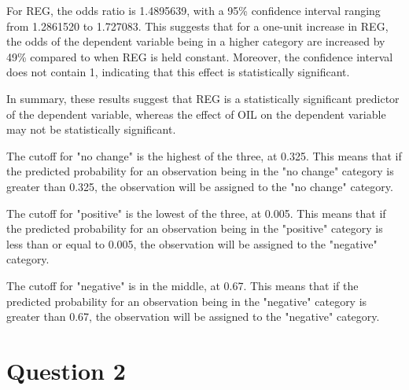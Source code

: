 \documentclass[12pt,letterpaper]{article}
\begin{document}
\begin{enumerate}
For REG, the odds ratio is 1.4895639, with a 95\% confidence interval ranging from 1.2861520 to 1.727083. This suggests that for a one-unit increase in REG, the odds of the dependent variable being in a higher category are increased by 49\% compared to when REG is held constant. Moreover, the confidence interval does not contain 1, indicating that this effect is statistically significant.

In summary, these results suggest that REG is a statistically significant predictor of the dependent variable, whereas the effect of OIL on the dependent variable may not be statistically significant.
	
	\noindent The cutoff for "no change" is the highest of the three, at 0.325. This means that if the predicted probability for an observation being in the "no change" category is greater than 0.325, the observation will be assigned to the "no change" category.
	
	The cutoff for "positive" is the lowest of the three, at 0.005. This means that if the predicted probability for an observation being in the "positive" category is less than or equal to 0.005, the observation will be assigned to the "negative" category.
	
	The cutoff for "negative" is in the middle, at 0.67. This means that if the predicted probability for an observation being in the "negative" category is greater than 0.67, the observation will be assigned to the "negative" category.
	
	
	
\end{enumerate}

\section*{Question 2} 
\vspace{.25cm}
\end{document}
